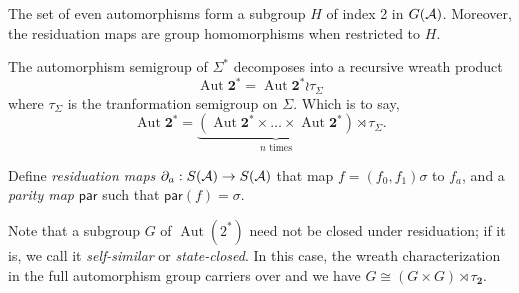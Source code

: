 \documentclass[11pt, titlepage]{article}
\begin{document}
The set of even automorphisms form a subgroup $H$ of index 2 in
$G(\mathcal{A})$. Moreover, the residuation maps are group homomorphisms when
restricted to $H$.

The automorphism semigroup of $\Sigma^*$ decomposes into a recursive
wreath product
\[
  \operatorname{Aut}\textbf{2}^* = \operatorname{Aut}\textbf{2}^* \wr
  \tau_\Sigma
\]
where $\tau_\Sigma$ is the tranformation semigroup on $\Sigma$. Which
is to say,
\[
  \operatorname{Aut}\textbf{2}^* =
  \underbrace{(\operatorname{Aut}\textbf{2}^* \times \ldots \times
    \operatorname{Aut}\textbf{2}^* )}_\text{$n$ times} \rtimes
  \tau_\Sigma.
\]

\begin{definition}
  Define \emph{residuation maps}
  $\partial_a : S(\mathcal{A}) \rightarrow S(\mathcal{A})$ that map
  $f = (f_0, f_1)\sigma$ to $f_a$, and a \emph{parity map}
  $\textsf{par}$ such that $\textsf{par}(f) = \sigma$.
\end{definition}

Note that a subgroup $G$ of $\operatorname{Aut}(2^*)$ need not be
closed under residuation; if it is, we call it \emph{self-similar} or
\emph{state-closed}. In this case, the wreath characterization in the
full automorphism group carriers over and we have
$G \cong (G \times G) \rtimes \tau_{\textbf{2}}$.



\end{document}
